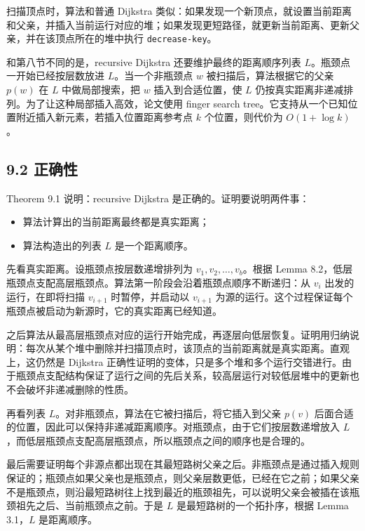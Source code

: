 \documentclass[UTF8]{ctexart}
\begin{document}
扫描顶点时，算法和普通 Dijkstra 类似：如果发现一个新顶点，就设置当前距离和父亲，并插入当前运行对应的堆；如果发现更短路径，就更新当前距离、更新父亲，并在该顶点所在的堆中执行 \texttt{decrease-key}。

和第八节不同的是，recursive Dijkstra 还要维护最终的距离顺序列表 \(L\)。瓶颈点一开始已经按层数放进 \(L\)。当一个非瓶颈点 \(w\) 被扫描后，算法根据它的父亲 \(p(w)\) 在 \(L\) 中做局部搜索，把 \(w\) 插入到合适位置，使 \(L\) 仍按真实距离非递减排列。为了让这种局部插入高效，论文使用 finger search tree。它支持从一个已知位置附近插入新元素，若插入位置距离参考点 \(k\) 个位置，则代价为 \(O(1+\log k)\)。

\subsection*{9.2 正确性}

Theorem 9.1 说明：recursive Dijkstra 是正确的。证明要说明两件事：

\begin{itemize}
  \item 算法计算出的当前距离最终都是真实距离；
  \item 算法构造出的列表 \(L\) 是一个距离顺序。
\end{itemize}

先看真实距离。设瓶颈点按层数递增排列为 \(v_1,v_2,\ldots,v_b\)。根据 Lemma 8.2，低层瓶颈点支配高层瓶颈点。算法第一阶段会沿着瓶颈点顺序不断递归：从 \(v_i\) 出发的运行，在即将扫描 \(v_{i+1}\) 时暂停，并启动以 \(v_{i+1}\) 为源的运行。这个过程保证每个瓶颈点被启动为新源时，它的真实距离已经知道。

之后算法从最高层瓶颈点对应的运行开始完成，再逐层向低层恢复。证明用归纳说明：每次从某个堆中删除并扫描顶点时，该顶点的当前距离就是真实距离。直观上，这仍然是 Dijkstra 正确性证明的变体，只是多个堆和多个运行交错进行。由于瓶颈点支配结构保证了运行之间的先后关系，较高层运行对较低层堆中的更新也不会破坏非递减删除的性质。

再看列表 \(L\)。对非瓶颈点，算法在它被扫描后，将它插入到父亲 \(p(v)\) 后面合适的位置，因此可以保持非递减距离顺序。对瓶颈点，由于它们按层数递增放入 \(L\)，而低层瓶颈点支配高层瓶颈点，所以瓶颈点之间的顺序也是合理的。

最后需要证明每个非源点都出现在其最短路树父亲之后。非瓶颈点是通过插入规则保证的；瓶颈点如果父亲也是瓶颈点，则父亲层数更低，已经在它之前；如果父亲不是瓶颈点，则沿最短路树往上找到最近的瓶颈祖先，可以说明父亲会被插在该瓶颈祖先之后、当前瓶颈点之前。于是 \(L\) 是最短路树的一个拓扑序，根据 Lemma 3.1，\(L\) 是距离顺序。
\end{document}
